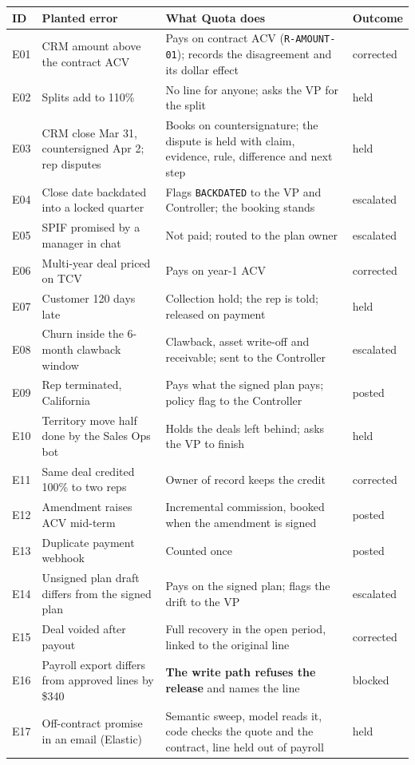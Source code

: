 \documentclass[10pt,a4paper]{article}
\newcommand{\gy}[1]{{\color{qgrey}#1}}
\newcommand{\code}[1]{{\small\texttt{#1}}}
\begin{document}
\renewcommand{\arraystretch}{1.12}
\begin{tabularx}{\textwidth}{@{}p{10mm}p{56mm}Xp{18mm}@{}}
\toprule
\textbf{ID} & \textbf{Planted error} & \textbf{What Quota does} & \textbf{Outcome}\\
\midrule
E01 & CRM amount above the contract ACV & Pays on contract ACV \gy{(\code{R-AMOUNT-01})}; records the disagreement and its dollar effect & corrected\\
E02 & Splits add to 110\% & No line for anyone; asks the VP for the split & held\\
E03 & CRM close Mar 31, countersigned Apr 2; rep disputes & Books on countersignature; the dispute is held with claim, evidence, rule, difference and next step & held\\
E04 & Close date backdated into a locked quarter & Flags \code{BACKDATED} to the VP and Controller; the booking stands & escalated\\
E05 & SPIF promised by a manager in chat & Not paid; routed to the plan owner & escalated\\
E06 & Multi-year deal priced on TCV & Pays on year-1 ACV & corrected\\
E07 & Customer 120 days late & Collection hold; the rep is told; released on payment & held\\
E08 & Churn inside the 6-month clawback window & Clawback, asset write-off and receivable; sent to the Controller & escalated\\
E09 & Rep terminated, California & Pays what the signed plan pays; policy flag to the Controller & posted\\
E10 & Territory move half done by the Sales Ops bot & Holds the deals left behind; asks the VP to finish & held\\
E11 & Same deal credited 100\% to two reps & Owner of record keeps the credit & corrected\\
E12 & Amendment raises ACV mid-term & Incremental commission, booked when the amendment is signed & posted\\
E13 & Duplicate payment webhook & Counted once & posted\\
E14 & Unsigned plan draft differs from the signed plan & Pays on the signed plan; flags the drift to the VP & escalated\\
E15 & Deal voided after payout & Full recovery in the open period, linked to the original line & corrected\\
E16 & Payroll export differs from approved lines by \$340 & \textbf{The write path refuses the release} and names the line & blocked\\
\midrule
E17 & Off-contract promise in an email \gy{(Elastic)} & Semantic sweep, model reads it, code checks the quote and the contract, line held out of payroll & held\\
\bottomrule
\end{tabularx}
\end{document}
